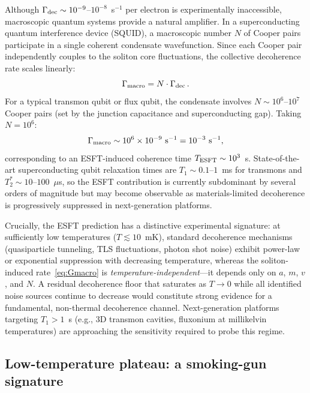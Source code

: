 ﻿\documentclass[a4paper,12pt]{article}
\begin{document}
Although $\Gamma_{\rm dec}\sim 10^{-9}$--$10^{-8}$~s$^{-1}$ per
electron is experimentally inaccessible, macroscopic quantum systems
provide a natural amplifier.  In a superconducting quantum interference device
(SQUID), a macroscopic number $N$ of Cooper pairs participate in a
single coherent condensate wavefunction.  Since each Cooper pair
independently couples to the soliton core fluctuations, the collective
decoherence rate scales linearly:
\begin{equation}
  \Gamma_{\rm macro} = N\cdot\Gamma_{\rm dec}\,.
  \label{eq:Gmacro}
\end{equation}
For a typical transmon qubit or flux qubit, the condensate involves
$N\sim 10^{6}$--$10^{7}$ Cooper pairs (set by the junction capacitance
and superconducting gap).  Taking $N=10^6$:
\begin{equation}
  \Gamma_{\rm macro} \sim 10^6 \times 10^{-9}~\text{s}^{-1}
    = 10^{-3}~\text{s}^{-1},
  \label{eq:Gmacro_num}
\end{equation}
corresponding to an ESFT-induced coherence time
$T_{\rm ESFT}\sim 10^3$~s.  State-of-the-art superconducting qubit
relaxation times are $T_1\sim 0.1$--$1$~ms for transmons and
$T_2^*\sim 10$--$100$~$\mu$s, so the ESFT contribution is currently
subdominant by several orders of magnitude but may become observable
as materials-limited decoherence is progressively suppressed in
next-generation platforms.

Crucially, the ESFT prediction has a distinctive experimental
signature: at sufficiently low temperatures ($T\lesssim 10$~mK),
standard decoherence mechanisms (quasiparticle tunneling, TLS
fluctuations, photon shot noise) exhibit power-law or exponential
suppression with decreasing temperature, whereas the soliton-induced
rate~\eqref{eq:Gmacro} is \emph{temperature-independent}---it depends
only on $a$, $m$, $v$, and $N$.  A residual decoherence floor
that saturates as $T\to 0$ while all identified noise sources continue
to decrease would constitute strong evidence for a fundamental,
non-thermal decoherence channel.  Next-generation platforms targeting
$T_1>1$~s (e.g., 3D transmon cavities, fluxonium at millikelvin
temperatures) are approaching the sensitivity required to probe this
regime.

\subsection{Low-temperature plateau: a smoking-gun signature}
\label{sec:plateau}
\end{document}

